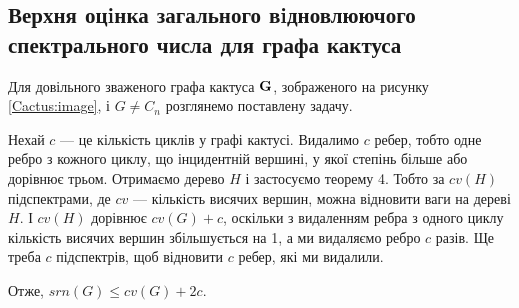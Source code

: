\subsection{Верхня оцiнка загального вiдновлюючого спектрального числа для графа кактуса}

Для довільного зваженого графа кактуса ${\bf G}$, зображеного на рисунку \ref{Cactus:image}, і $G\neq C_n$ розглянемо поставлену задачу.

Нехай $c$ --- це кількість циклів у графі кактусі. Видалимо $c$ ребер, тобто одне ребро з кожного циклу, що інцидентній вершині, у якої степінь більше або дорівнює трьом. Отримаємо дерево $H$ і застосуємо теорему 4. Тобто за $cv(H)$ підспектрами, де $cv$ --- кількість висячих вершин, можна відновити ваги на дереві $H$. І $cv(H)$ дорівнює $cv(G)+c$, оскільки з видаленням ребра з одного циклу кількість висячих вершин збільшується на 1, а ми видаляємо ребро $c$ разів. Ще треба $c$ підспектрів, щоб відновити $c$ ребер, які ми видалили.

Отже, $srn(G) \leq cv(G) +2c$.